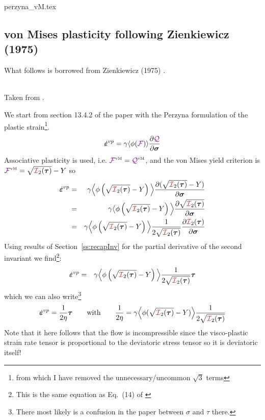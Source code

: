 \begin{flushright} {\tiny {\color{gray} perzyna\_vM.tex}} \end{flushright}

\subsection{von Mises plasticity following Zienkiewicz (1975)}

What follows is borrowed from Zienkiewicz (1975) \cite{zien75}.

\begin{center}
\\
{\captionfont Taken from \textcite{zien75}.}
\end{center}

We start from section 13.4.2 of the paper with the Perzyna formulation of the plastic 
strain\footnote{from which I have removed the unnecessary/uncommon $\sqrt 3$ terms}. 
\[
\dot{\bm \varepsilon}^{vp} = \gamma \langle \phi({{\color{violet}\cal F}}) \rangle \frac{\partial {\color{violet}\cal Q}}{\partial \bm\sigma}
\]
Associative plasticity is used, i.e. ${{\color{violet}\cal F}}^{\text{\tiny vM}}={\cal {\color{violet}\cal Q}}^{\text{\tiny vM}}$, and the von Mises yield
criterion is ${\FFF}^{\text{\tiny vM}}=\sqrt{{\III}_2(\bm \tau)}- Y$ so
\begin{eqnarray}
\dot{\bm \varepsilon}^{vp} 
&=& \gamma \Big\langle \phi\left(\sqrt{{\III}_2(\bm \tau)}- Y\right)  \Big\rangle 
\frac{\partial (\sqrt{{\III}_2(\bm \tau)}- Y)}{\partial \bm\sigma} \nn\\
&=& \gamma \big\langle \phi\left(\sqrt{{\III}_2(\bm \tau)}- Y\right)  \Big\rangle 
\frac{\partial \sqrt{{\III}_2(\bm \tau)}}{\partial \bm\sigma} \nn\\
&=& \gamma \Big\langle \phi\left(\sqrt{{\III}_2(\bm \tau)}- Y\right)  \Big\rangle 
\frac{1}{2 \sqrt{{\III}_2(\bm \tau)}} \frac{\partial {\III}_2(\bm \tau)}{\partial \bm\sigma}
\end{eqnarray}
Using results of Section~\ref{ss:recapInv} for the partial derivative of the second invariant
we find\footnote{This is the same equation as Eq.~(14) of 
\textcite{zijo78}}:
\begin{eqnarray}
\dot{\bm \varepsilon}^{vp} 
&=& \gamma \Big\langle \phi\left(\sqrt{{\III}_2(\bm \tau)}- Y \right)  \Big\rangle 
\frac{1}{2 \sqrt{{\III}_2(\bm \tau)}} {\bm \tau}
\end{eqnarray}
which we can also write\footnote{There most likely is a confusion in 
the paper between $\sigma$ and $\tau$ there.}
\[
\dot{\bm \varepsilon}^{vp} =
\frac{1}{2\eta} \bm\tau
\qquad
{\rm with}
\qquad
\frac{1}{2\eta} = \gamma \Big\langle \phi(\sqrt{{\III}_2(\bm \tau)}- Y) \Big\rangle 
\frac{1}{2 \sqrt{{\III}_2(\bm \tau)}}
\]
Note that it here follows that the flow is incompressible since 
the visco-plastic strain rate tensor is proportional to the deviatoric stress tensor
so it is deviatoric itself!

